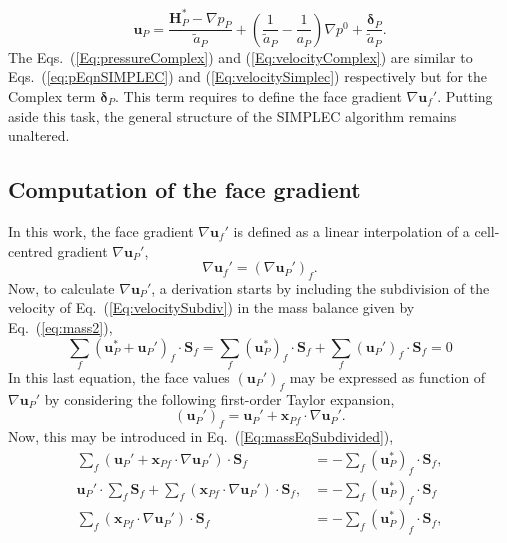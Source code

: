 \documentclass[final,3p,times,11pt,onecolumn]{myElsarticle}
\numberwithin{equation}{section}
\begin{document}
\begin{equation}
\label{Eq:velocityComplex}
\boldsymbol{u}_P 
=
\dfrac
{
\boldsymbol{H}_P^*
- 
\nabla p_P}
{\tilde{a}_P}
+
\left(
\dfrac{1}
{\tilde{a}_P}
-
\dfrac{1}
{a_P}
\right)
\nabla p^{0}
+
\dfrac{\boldsymbol{\delta}_P}
{\tilde{a}_P}.
\end{equation}
The Eqs.~(\ref{Eq:pressureComplex}) and (\ref{Eq:velocityComplex}) are similar to Eqs.~(\ref{eq:pEqnSIMPLEC}) and (\ref{Eq:velocitySimplec}) respectively but for the Complex term $\boldsymbol{\delta}_P$. This term requires to define the face gradient $\nabla \boldsymbol{u}_f'$. Putting aside this task, the general structure of the SIMPLEC algorithm remains unaltered. 

\subsection{Computation of the face gradient}
In this work, the face gradient $\nabla \boldsymbol{u}_f' $ is defined as a linear interpolation of a cell-centred gradient $\nabla \boldsymbol{u}_P'$,
\begin{equation}
\label{Eq:UFaceGradient}
\nabla \boldsymbol{u}_f'
=
(\nabla \boldsymbol{u}_P')_f.
\end{equation}
Now, to calculate $\nabla \boldsymbol{u}_P'$, a derivation starts by including the subdivision of the velocity of Eq.~(\ref{Eq:velocitySubdiv}) in the mass balance given by Eq.~(\ref{eq:mass2}),
\begin{equation}
\label{Eq:massEqSubdivided}
\sum_{f} 
\left(
\boldsymbol{u}_{P}^*
+ 
\boldsymbol{u}_{P}'
\right)_f
\cdotp \textbf{S}_{f} 
=
\sum_{f} 
\left(
\boldsymbol{u}_{P}^*
\right)_f
\cdotp \textbf{S}_{f}
+
\sum_{f} 
\left(
\boldsymbol{u}_{P}'
\right)_f
\cdotp \textbf{S}_{f}
=
0
\end{equation}
In this last equation, the face values $\left(\boldsymbol{u}_P'\right)_f$ may be expressed as function of $\nabla \boldsymbol{u}_P'$ by considering the following first-order Taylor expansion,
\begin{equation}
\label{Eq:TaylorOnFace}
\left(
\boldsymbol{u}_P'
\right)_f
=
\boldsymbol{u}_P'
+
\boldsymbol{x}_{Pf}
\cdot 
\nabla \boldsymbol{u}_P'.
\end{equation} 
Now, this may be introduced in Eq.~(\ref{Eq:massEqSubdivided}),
\begin{align}
\sum_f 
\left(
\boldsymbol{u}_P'
+
\boldsymbol{x}_{Pf}
\cdot 
\nabla \boldsymbol{u}_P'
\right)
\cdot 
\boldsymbol{S}_f 
&=
-\sum_f
\left(
\boldsymbol{u}_P^{*}
\right)_{f} 
\cdot 
\boldsymbol{S}_f,
\\
\boldsymbol{u}_P'
\cdot 
\sum_f 
\boldsymbol{S}_f
+
\sum_f 
\left(
\boldsymbol{x}_{Pf}
\cdot 
\nabla \boldsymbol{u}_P'
\right)
\cdot 
\boldsymbol{S}_f,
&=
-\sum_f
\left(
\boldsymbol{u}_P^{*}
\right)_{f} 
\cdot 
\boldsymbol{S}_f
\\
\label{Eq:Last}
\sum_f 
\left(
\boldsymbol{x}_{Pf}
\cdot 
\nabla \boldsymbol{u}_P'
\right)
\cdot 
\boldsymbol{S}_f
&=
-\sum_f
\left(
\boldsymbol{u}_P^{*}
\right)_{f} 
\cdot 
\boldsymbol{S}_f,
\end{align}
\end{document}
